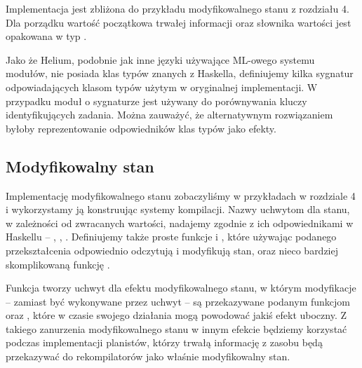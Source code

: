 

Implementacja jest zbliżona do przykładu modyfikowalnego stanu z rozdziału 4. Dla porządku wartość początkowa trwałej informacji oraz słownika wartości jest opakowana w typ .

Jako że Helium, podobnie jak inne języki używające ML-owego systemu modułów, nie posiada klas typów znanych z Haskella, definiujemy kilka sygnatur odpowiadających klasom typów użytym w oryginalnej implementacji. W przypadku  moduł o sygnaturze  jest używany do porównywania kluczy identyfikujących zadania. Można zauważyć, że alternatywnym rozwiązaniem byłoby reprezentowanie odpowiedników klas typów jako efekty.

\begin{minipage}[t]{.45\textwidth}

  

\end{minipage}\hfill
\begin{minipage}[t]{.45\textwidth}

  

\end{minipage}

\subsection{Modyfikowalny stan}

Implementację modyfikowalnego stanu zobaczyliśmy w przykładach w rozdziale 4 i wykorzystamy ją konstruując systemy kompilacji. Nazwy uchwytom dla stanu, w zależności od zwracanych wartości, nadajemy zgodnie z ich odpowiednikami w Haskellu -- , , . Definiujemy także proste funkcje  i , które używając podanego przekształcenia odpowiednio odczytują i modyfikują stan, oraz nieco bardziej skomplikowaną funkcję .



Funkcja  tworzy uchwyt dla efektu modyfikowalnego stanu, w którym modyfikacje -- zamiast być wykonywane przez uchwyt -- są przekazywane podanym funkcjom  oraz , które w czasie swojego działania mogą powodować jakiś efekt uboczny. Z takiego zanurzenia modyfikowalnego stanu w innym efekcie będziemy korzystać podczas implementacji planistów, którzy trwałą informację z zasobu będą przekazywać do rekompilatorów jako właśnie modyfikowalny stan.

